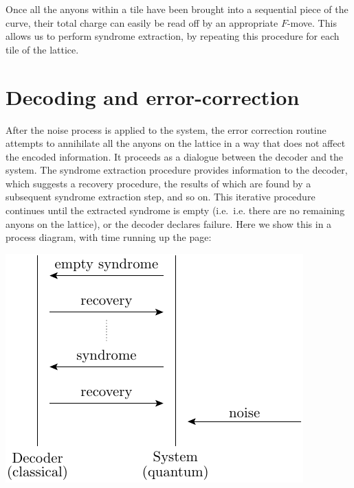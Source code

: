 \documentclass[aps, letterpaper, onecolumn, superscriptaddress, notitlepage, 10pt]{revtex4-1}
\begin{document}

Once all the anyons within a tile have been brought into a sequential piece of the curve, their total charge can easily be read off by an appropriate $F$-move. This allows us to perform syndrome extraction, by repeating this procedure for each tile of the lattice.

%
%

\section{Decoding and error-correction}

After the noise process is applied to the system,
the error correction routine attempts to annihilate all the anyons on the lattice in a way that does not affect the encoded information. It proceeds as a dialogue between the
decoder and the system. The syndrome extraction procedure provides information to the decoder, which suggests a recovery procedure, the results of which are found by a subsequent syndrome extraction step, and so on. This iterative procedure continues until the extracted syndrome is empty (i.e.~i.e. there are no remaining anyons on the lattice), or the decoder declares failure.
%
Here we show this in a process diagram, with time running up
the page:
\begin{center}
\includegraphics[]{pic-process.pdf}
\end{center}
\end{document}
